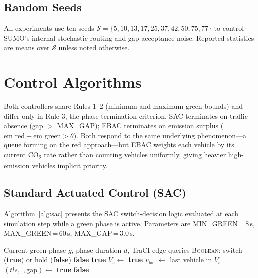 \documentclass[review,3p,authoryear,times]{elsarticle}
\begin{document}
\subsection{Random Seeds}
\label{sec:seeds}

All experiments use ten seeds
$\mathcal{S}=\{5,10,13,17,25,37,42,50,75,77\}$ to control SUMO's internal
stochastic routing and gap-acceptance noise. Reported statistics are means
over $\mathcal{S}$ unless noted otherwise.

\section{Control Algorithms}
\label{sec:algo}

Both controllers share Rules 1--2 (minimum and maximum green bounds) and
differ only in Rule 3, the phase-termination criterion. SAC terminates on
traffic absence (gap $>$ MAX\_GAP); EBAC terminates on emission surplus
($\text{em\_red} - \text{em\_green} > \theta$). Both respond to the same
underlying phenomenon---a queue forming on the red approach---but EBAC
weights each vehicle by its current CO\textsubscript{2} rate rather than
counting vehicles uniformly, giving heavier high-emission vehicles implicit
priority.

\subsection{Standard Actuated Control (SAC)}

Algorithm~\ref{alg:sac} presents the SAC switch-decision logic evaluated at
each simulation step while a green phase is active. Parameters are
MIN\_GREEN\,=\,8\,s, MAX\_GREEN\,=\,60\,s, MAX\_GAP\,=\,3.0\,s.

\begin{algorithm}[H]
\caption{Standard Actuated Control (SAC) — switch decision}
\label{alg:sac}
\begin{algorithmic}[1]
\Require Current green phase $g$, phase duration $d$, TraCI edge queries
\Ensure \textsc{Boolean}: switch (\textbf{true}) or hold (\textbf{false})
 \Return \textbf{false} 
\EndIf
{} \Return \textbf{true} 
\EndIf
{}
  \State $V_e \gets$ 
   \Return \textbf{true} 
  \EndIf
  \State $v_{\text{last}} \gets$ last vehicle in $V_e$
  \State $(tls, \_, \text{gap}) \gets$ 
   \Return \textbf{true} 
  \EndIf
\EndFor
\State \Return \textbf{false} 
\end{algorithmic}
\end{algorithm}
\end{document}
